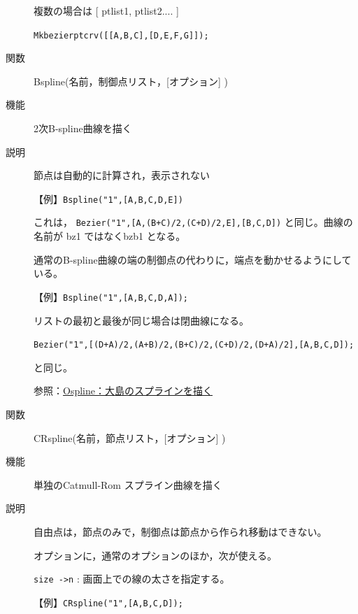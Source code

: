 \documentclass[papersize,a4paper,12pt,uplatex]{jsarticle}
\begin{document}
\begin{description}
複数の場合は  [ ptlist1, ptlist2.... ]

\verb|Mkbezierptcrv([[A,B,C],[D,E,F,G]]);|

\vspace{40mm}

 \vspace{\baselineskip}
\hypertarget{bspline}{}
\item[関数]  Bspline(名前，制御点リスト，[オプション] )
\item[機能]  2次B-spline曲線を描く
\item[説明]  節点は自動的に計算され，表示されない

 \vspace{\baselineskip}
【例】\verb|Bspline("1",[A,B,C,D,E])|

これは， \verb|Bezier("1",[A,(B+C)/2,(C+D)/2,E],[B,C,D])|  と同じ。曲線の名前が bz1 ではなくbzb1 となる。

通常のB-spline曲線の端の制御点の代わりに，端点を動かせるようにしている。

        \begin{center} \end{center}

【例】\verb|Bspline("1",[A,B,C,D,A]);|

リストの最初と最後が同じ場合は閉曲線になる。
  
 \verb|Bezier("1",[(D+A)/2,(A+B)/2,(B+C)/2,(C+D)/2,(D+A)/2],[A,B,C,D]);| 
 
 と同じ。

  \begin{center} \end{center}

参照：\hyperlink{ospline}{Ospline：大島のスプラインを描く} 

\vspace{\baselineskip}
\hypertarget{crspline}{}
\item[関数]  CRspline(名前，節点リスト，[オプション] )
\item[機能]  単独のCatmull-Rom スプライン曲線を描く
\item[説明]
自由点は，節点のみで，制御点は節点から作られ移動はできない。
  
オプションに，通常のオプションのほか，次が使える。

\verb|size ->n|  :  画面上での線の太さを指定する。

【例】\verb|CRspline("1",[A,B,C,D]);|

\hspace{20mm} 


\end{description}
\end{document}
